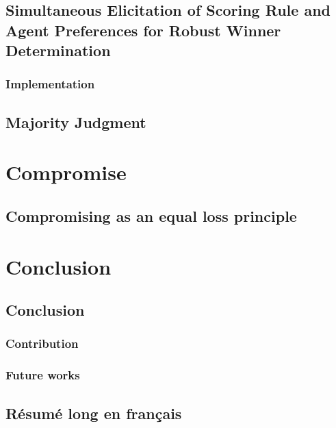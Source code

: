 \documentclass[a4paper, 11pt]{book}
\begin{document}
	\chapter[Simultaneous Elicitation of PSR and Agent Preferences]{Simultaneous Elicitation of Scoring Rule and Agent Preferences for Robust Winner Determination}
		\label{ch:minimax}
		\section{Implementation}
	\chapter{Majority Judgment}
		\label{ch:MJ}

\part{Compromise}
\chapter{Compromising as an equal loss principle}
\label{ch:compromise}
%	

\part{Conclusion}
	\chapter{Conclusion}
		\section{Contribution}
		\section{Future works}




\backmatter



 

\chapter{Résumé long en français}
\end{document}
